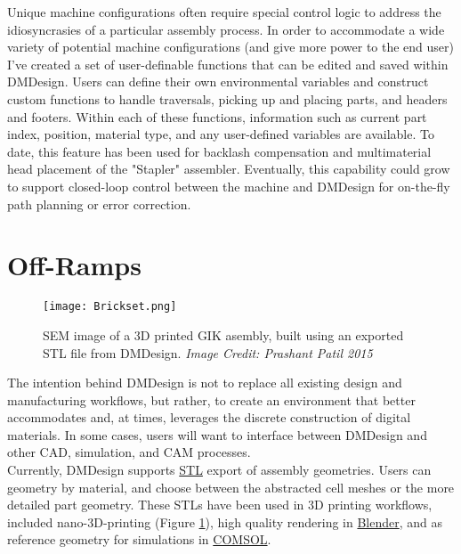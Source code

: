 {Unique machine configurations often require special control logic to address the idiosyncrasies of a particular assembly process.  In order to accommodate a wide variety of potential machine configurations (and give more power to the end user) I've created a set of user-definable functions that can be edited and saved within DMDesign.  Users can define their own environmental variables and construct custom functions to handle traversals, picking up and placing parts, and headers and footers.  Within each of these functions, information such as current part index, position, material type, and any user-defined variables are available.  To date, this feature has been used for backlash compensation and multimaterial head placement of the "Stapler" assembler.  Eventually, this capability could grow to support closed-loop control between the machine and DMDesign for on-the-fly path planning or error correction.\\

\section{Off-Ramps}

\begin{figure}
  \texttt{[image: Brickset.png]}
  \caption{SEM image of a 3D printed GIK asembly, built using an exported STL file from DMDesign.  \textit{Image Credit: Prashant Patil 2015}}
  \label{fig:BrickSet}
\end{figure}

The intention behind DMDesign is not to replace all existing design and manufacturing workflows, but rather, to create an environment that better accommodates and, at times, leverages the discrete construction of digital materials.  In some cases, users will want to interface between DMDesign and other CAD, simulation, and CAM processes.\\

Currently, DMDesign supports \href{https://en.wikipedia.org/wiki/STL_(file_format)}{STL} export of assembly geometries.  Users can geometry by material, and choose between the abstracted cell meshes or the more detailed part geometry.  These STLs have been used in 3D printing workflows, included nano-3D-printing (Figure \ref{fig:BrickSet}), high quality rendering in \href{https://www.blender.org/}{Blender}, and as reference geometry for simulations in \href{https://www.comsol.com/}{COMSOL}.

}
